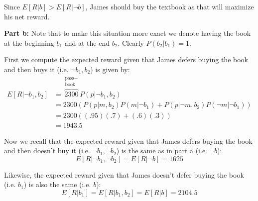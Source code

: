\documentclass{article}
\begin{document}
Since $E[R|b]>E[R|\neg b]$, James should buy the textbook as that will maximize his net reward.
\bigskip


\noindent\textbf{Part b:} Note that to make this situation more exact we denote having the book at the beginning $b_1$ and at the end $b_2$. Clearly $P(b_2| b_1)=1$.
\newline


First we compute the expected reward given that James defers buying the book and then buys it (i.e. $\neg b_1, b_2$) is given by:
\begin{align*}
  E[R|\neg b_1, b_2]&=\overbrace{2300}^{\substack{\text{pass}-\\\text{book}}} P(p|\neg b_1, b_2)\tag{def. of conditional expectation}\\
  &=2300(P(p|m,b_2)P(m|\neg b_1)+P(p|\neg m,b_2)P(\neg m|\neg b_1))\tag{chain rule \& total probability}\\
  &=2300((.95)(.7)+(.6)(.3))\\
  &=1943.5
\end{align*}

Now we recall that the expected reward given that James defers buying the book and then doesn't buy it (i.e. $\neg b_1,\neg b_2$) is the same as in part a (i.e. $\neg b$):
$$E[R|\neg b_1,\neg b_2]= E[R|\neg b]=1625$$

Likewise, the expected reward given that James doesn't defer buying the book (i.e. $b_1$) is also the same (i.e. $b$):
$$E[R|b_1]=E[R|b_1,b_2]= E[R|b]=2104.5$$
\end{document}

